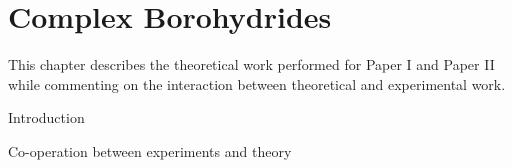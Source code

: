 \chapter{Complex Borohydrides}
\label{chap:borohydrides}

This chapter describes the theoretical work performed for Paper I and Paper II while commenting on the interaction between theoretical and experimental work.

\bit
\item Introduction
\item Co-operation between experiments and theory
\item {}
\item {}
\eit

\placeholder
